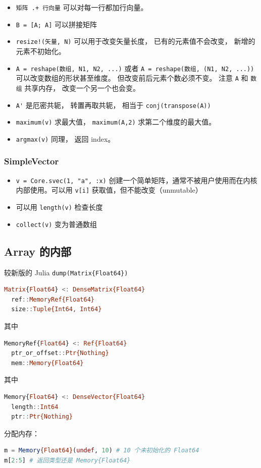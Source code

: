 \begin{itemize}
\item \verb`矩阵 .+ 行向量` 可以对每一行都加行向量。
\item \verb`B = [A; A]` 可以拼接矩阵
\item \verb`resize!(矢量, N)` 可以用于改变矢量长度， 已有的元素值不会改变， 新增的元素不初始化。
\item \verb`A = reshape(数组, N1, N2, ...)` 或者 \verb`A = reshape(数组, (N1, N2, ...))` 可以改变数组的形状甚至维度。 但改变前后元素个数必须不变。 注意 \verb`A` 和 \verb`数组` 共享内存， 改变一个另一个也会变。
\item \verb`A'` 是厄密共轭， 转置再取共轭， 相当于 \verb`conj(transpose(A))`
\item \verb`maximum(v)` 求最大值， \verb`maximum(A,2)` 求第二个维度的最大值。
\item \verb`argmax(v)` 同理， 返回 index。
\end{itemize}

\subsubsection{SimpleVector}
\begin{itemize}
\item \verb`v = Core.svec(1, "a", :x)` 创建一个简单矩阵，通常不被用户使用而在内核内部使用。可以用 \verb`v[i]` 获取值，但不能改变（unmutable）
\item 可以用 \verb`length(v)` 检查长度
\item \verb`collect(v)` 变为普通数组
\end{itemize}


\subsection{Array 的内部}
较新版的 Julia \verb`dump(Matrix{Float64})`
\begin{lstlisting}[language=julia]
Matrix{Float64} <: DenseMatrix{Float64}
  ref::MemoryRef{Float64}
  size::Tuple{Int64, Int64}
\end{lstlisting}
其中
\begin{lstlisting}[language=julia]
MemoryRef{Float64} <: Ref{Float64}
  ptr_or_offset::Ptr{Nothing}
  mem::Memory{Float64}
\end{lstlisting}
其中
\begin{lstlisting}[language=julia]
Memory{Float64} <: DenseVector{Float64}
  length::Int64
  ptr::Ptr{Nothing}
\end{lstlisting}
分配内存：
\begin{lstlisting}[language=julia]
m = Memory{Float64}(undef, 10) # 10 个未初始化的 Float64
m[2:5] # 返回类型还是 Memory{Float64}
\end{lstlisting}

